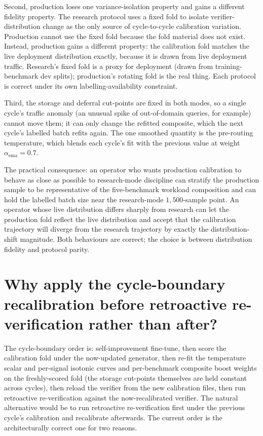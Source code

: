 Second, production loses one variance-isolation property and gains a different fidelity property. The research protocol uses a fixed fold to isolate verifier-distribution change as the only source of cycle-to-cycle calibration variation. Production cannot use the fixed fold because the fold material does not exist. Instead, production gains a different property: the calibration fold matches the live deployment distribution exactly, because it is drawn from live deployment traffic. Research's fixed fold is a proxy for deployment (drawn from training-benchmark dev splits); production's rotating fold is the real thing. Each protocol is correct under its own labelling-availability constraint.

Third, the storage and deferral cut-points are fixed in both modes, so a single cycle's traffic anomaly (an unusual spike of out-of-domain queries, for example) cannot move them; it can only change the refitted composite, which the next cycle's labelled batch refits again. The one smoothed quantity is the pre-routing temperature, which blends each cycle's fit with the previous value at weight $\alpha_{\text{ema}} = 0.7$.

The practical consequence: an operator who wants production calibration to behave as close as possible to research-mode discipline can stratify the production sample to be representative of the five-benchmark workload composition and can hold the labelled batch size near the research-mode $1{,}500$-sample point. An operator whose live distribution differs sharply from research can let the production fold reflect the live distribution and accept that the calibration trajectory will diverge from the research trajectory by exactly the distribution-shift magnitude. Both behaviours are correct; the choice is between distribution fidelity and protocol parity.


\section[Cycle-boundary ordering]{Why apply the cycle-boundary recalibration before retroactive re-verification rather than after?}
\label{app:qa-cycle-order}

The cycle-boundary order is: self-improvement fine-tune, then score the calibration fold under the now-updated generator, then re-fit the temperature scalar and per-signal isotonic curves and per-benchmark composite boost weights on the freshly-scored fold (the storage cut-points themselves are held constant across cycles), then reload the verifier from the new calibration files, then run retroactive re-verification against the now-recalibrated verifier. The natural alternative would be to run retroactive re-verification first under the previous cycle's calibration and recalibrate afterwards. The current order is the architecturally correct one for two reasons.

